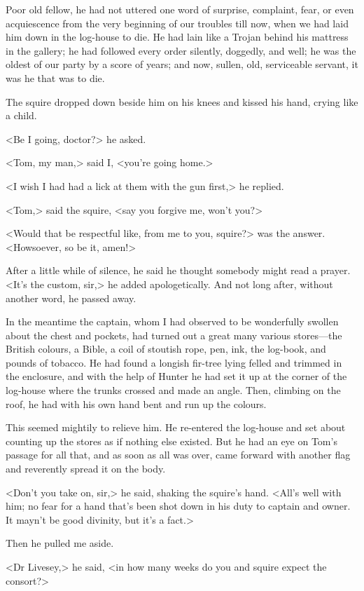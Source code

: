 Poor old fellow, he had not uttered one word of surprise, complaint, fear, or even acquiescence from the very beginning of our troubles till now, when we had laid him down in the log-house to die. He had lain like a Trojan behind his mattress in the gallery; he had followed every order silently, doggedly, and well; he was the oldest of our party by a score of years; and now, sullen, old, serviceable servant, it was he that was to die.

The squire dropped down beside him on his knees and kissed his hand, crying like a child.

<Be I going, doctor?> he asked.

<Tom, my man,> said I, <you're going home.>

<I wish I had had a lick at them with the gun first,> he replied.

<Tom,> said the squire, <say you forgive me, won't you?>

<Would that be respectful like, from me to you, squire?> was the answer. <Howsoever, so be it, amen!>

After a little while of silence, he said he thought somebody might read a prayer. <It's the custom, sir,> he added apologetically. And not long after, without another word, he passed away.

In the meantime the captain, whom I had observed to be wonderfully swollen about the chest and pockets, had turned out a great many various stores—the British colours, a Bible, a coil of stoutish rope, pen, ink, the log-book, and pounds of tobacco. He had found a longish fir-tree lying felled and trimmed in the enclosure, and with the help of Hunter he had set it up at the corner of the log-house where the trunks crossed and made an angle. Then, climbing on the roof, he had with his own hand bent and run up the colours.

This seemed mightily to relieve him. He re-entered the log-house and set about counting up the stores as if nothing else existed. But he had an eye on Tom's passage for all that, and as soon as all was over, came forward with another flag and reverently spread it on the body.

<Don't you take on, sir,> he said, shaking the squire's hand. <All's well with him; no fear for a hand that's been shot down in his duty to captain and owner. It mayn't be good divinity, but it's a fact.>

Then he pulled me aside.

<Dr Livesey,> he said, <in how many weeks do you and squire expect the consort?>

